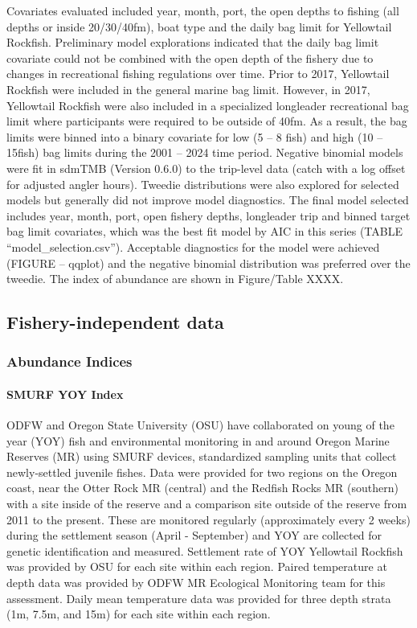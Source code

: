 \documentclass[
]{scrartcl}
\let\oldparagraph\paragraph
\renewcommand{\paragraph}[1]{\oldparagraph{#1}\mbox{}}
\begin{document}
Covariates evaluated included year, month, port, the open depths to
fishing (all depths or inside 20/30/40fm), boat type and the daily bag
limit for Yellowtail Rockfish. Preliminary model explorations indicated
that the daily bag limit covariate could not be combined with the open
depth of the fishery due to changes in recreational fishing regulations
over time. Prior to 2017, Yellowtail Rockfish were included in the
general marine bag limit. However, in 2017, Yellowtail Rockfish were
also included in a specialized longleader recreational bag limit where
participants were required to be outside of 40fm. As a result, the bag
limits were binned into a binary covariate for low (5 -- 8 fish) and
high (10 -- 15fish) bag limits during the 2001 -- 2024 time period.
Negative binomial models were fit in sdmTMB (Version 0.6.0) to the
trip-level data (catch with a log offset for adjusted angler hours).
Tweedie distributions were also explored for selected models but
generally did not improve model diagnostics. The final model selected
includes year, month, port, open fishery depths, longleader trip and
binned target bag limit covariates, which was the best fit model by AIC
in this series (TABLE ``model\_selection.csv''). Acceptable diagnostics
for the model were achieved (FIGURE -- qqplot) and the negative binomial
distribution was preferred over the tweedie. The index of abundance are
shown in Figure/Table XXXX.

\subsection{Fishery-independent data}\label{fishery-independent-data}

\subsubsection{Abundance Indices}\label{abundance-indices-1}

\paragraph{SMURF YOY Index}\label{smurf-yoy-index}

ODFW and Oregon State University (OSU) have collaborated on young of the
year (YOY) fish and environmental monitoring in and around Oregon Marine
Reserves (MR) using SMURF devices, standardized sampling units that
collect newly-settled juvenile fishes. Data were provided for two
regions on the Oregon coast, near the Otter Rock MR (central) and the
Redfish Rocks MR (southern) with a site inside of the reserve and a
comparison site outside of the reserve from 2011 to the present. These
are monitored regularly (approximately every 2 weeks) during the
settlement season (April - September) and YOY are collected for genetic
identification and measured. Settlement rate of YOY Yellowtail Rockfish
was provided by OSU for each site within each region. Paired temperature
at depth data was provided by ODFW MR Ecological Monitoring team for
this assessment. Daily mean temperature data was provided for three
depth strata (1m, 7.5m, and 15m) for each site within each region.
\end{document}
